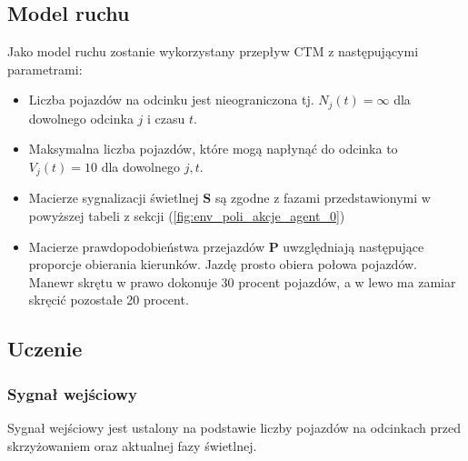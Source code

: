 \documentclass[12pt]{book}
\theoremstyle{plain}
\newcommand{\myref}[1]{(\ref{#1})}
\begin{document}
\subsection{Model ruchu}
Jako model ruchu zostanie wykorzystany przepływ CTM z następującymi parametrami:
\begin{itemize}
	\item Liczba pojazdów na odcinku jest nieograniczona tj. $N_j(t)=\infty$ dla dowolnego odcinka $j$ i czasu $t$.
	\item Maksymalna liczba pojazdów, które mogą napłynąć do odcinka to $V_j(t)=10$ dla dowolnego $j,t$.
	\item Macierze sygnalizacji świetlnej $\textbf{S}$ są zgodne z fazami przedstawionymi w powyższej tabeli z sekcji \myref{fig:env_poli_akcje_agent_0}
	\item Macierze prawdopodobieństwa przejazdów $\textbf{P}$ uwzględniają następujące proporcje obierania kierunków. Jazdę prosto obiera połowa pojazdów. Manewr skrętu w prawo dokonuje 30 procent pojazdów, a w lewo ma zamiar skręcić pozostałe 20 procent.
\end{itemize}


\subsection{Uczenie}
\subsubsection*{Sygnał wejściowy}
Sygnał wejściowy jest ustalony na podstawie liczby pojazdów na odcinkach przed skrzyżowaniem oraz aktualnej fazy świetlnej.
\end{document}
